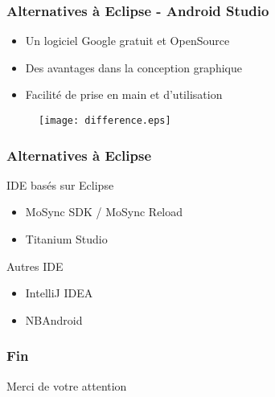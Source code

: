 \documentclass{beamer}
\begin{document}
\begin{frame}
  \frametitle{Alternatives à Eclipse - Android Studio}
     \begin{itemize}
        \item Un logiciel Google gratuit et OpenSource
        \item Des avantages dans la conception graphique
        \item Facilité de prise en main et d'utilisation
     \end{itemize}
     \begin{figure}[t]
        \centering
         \texttt{[image: difference.eps]}
    \end{figure}
\end{frame}



\begin{frame}
  \frametitle{Alternatives à Eclipse}
   \begin{block}{IDE basés sur Eclipse}
    \begin{itemize}
            \item MoSync SDK / MoSync Reload
            \item Titanium Studio
    \end{itemize}
  \end{block}
  \pause
  \begin{block}{Autres IDE}
    \begin{itemize}
        \item IntelliJ IDEA
        \item NBAndroid
    \end{itemize}
  \end{block}
\end{frame}


\begin{frame}
  \frametitle{Fin}
\centering Merci de votre attention
\end{frame}
\end{document}
